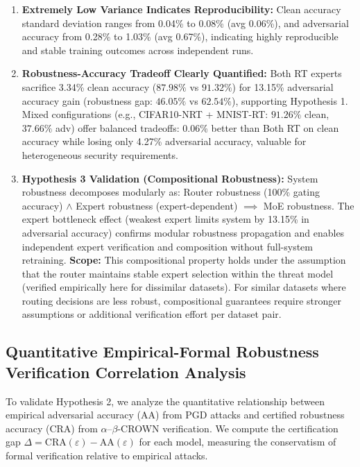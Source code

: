 \documentclass[11pt,a4paper]{article}
\begin{document}
\begin{enumerate}
    \item \textbf{Extremely Low Variance Indicates Reproducibility:} Clean accuracy standard deviation ranges from 0.04\% to 0.08\% (avg 0.06\%), and adversarial accuracy from 0.28\% to 1.03\% (avg 0.67\%), indicating highly reproducible and stable training outcomes across independent runs.

    \item \textbf{Robustness-Accuracy Tradeoff Clearly Quantified:} Both RT experts sacrifice 3.34\% clean accuracy ($87.98\%$ vs $91.32\%$) for 13.15\% adversarial accuracy gain (robustness gap: $46.05\%$ vs $62.54\%$), supporting Hypothesis 1. Mixed configurations (e.g., CIFAR10-NRT + MNIST-RT: $91.26\%$ clean, $37.66\%$ adv) offer balanced tradeoffs: 0.06\% better than Both RT on clean accuracy while losing only 4.27\% adversarial accuracy, valuable for heterogeneous security requirements.

    \item \textbf{Hypothesis 3 Validation (Compositional Robustness):} System robustness decomposes modularly as: Router robustness (100\% gating accuracy) $\land$ Expert robustness (expert-dependent) $\implies$ MoE robustness. The expert bottleneck effect (weakest expert limits system by 13.15\% in adversarial accuracy) confirms modular robustness propagation and enables independent expert verification and composition without full-system retraining. \textbf{Scope:} This compositional property holds under the assumption that the router maintains stable expert selection within the threat model (verified empirically here for dissimilar datasets). For similar datasets where routing decisions are less robust, compositional guarantees require stronger assumptions or additional verification effort per dataset pair.
\end{enumerate}

\subsection{Quantitative Empirical-Formal Robustness Verification Correlation Analysis}

To validate Hypothesis 2, we analyze the quantitative relationship between empirical adversarial accuracy (AA) from PGD attacks and certified robustness accuracy (CRA) from $\alpha$--$\beta$-CROWN verification. We compute the certification gap $\Delta = \text{CRA}(\varepsilon) - \text{AA}(\varepsilon)$ for each model, measuring the conservatism of formal verification relative to empirical attacks.
\end{document}
